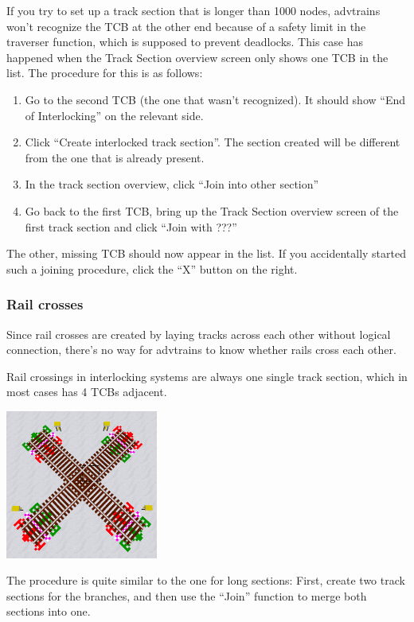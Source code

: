 \documentclass[english]{paper}
\begin{document}
If you try to set up a track section that is longer than 1000 nodes,
advtrains won't recognize the TCB at the other end because of a safety
limit in the traverser function, which is supposed to prevent deadlocks.
This case has happened when the Track Section overview screen only
shows one TCB in the list. The procedure for this is as follows:
\begin{enumerate}
\item Go to the second TCB (the one that wasn't recognized). It should show
``End of Interlocking'' on the relevant side.
\item Click ``Create interlocked track section''. The section created
will be different from the one that is already present.
\item In the track section overview, click ``Join into other section''
\item Go back to the first TCB, bring up the Track Section overview screen
of the first track section and click ``Join with ???''
\end{enumerate}
The other, missing TCB should now appear in the list. If you accidentally
started such a joining procedure, click the ``X'' button on the
right.

\subsubsection{Rail crosses}

Since rail crosses are created by laying tracks across each other
without logical connection, there's no way for advtrains to know whether
rails cross each other.

Rail crossings in interlocking systems are always one single track
section, which in most cases has 4 TCBs adjacent.

\includegraphics[width=5cm]{5_home_moritz_Home_Projekte_Minetest_minetest_m____lyx_img_Bildschirmfoto_2018-08-30_14-51-25.png}

The procedure is quite similar to the one for long sections: First,
create two track sections for the branches, and then use the ``Join''
function to merge both sections into one.
\end{document}
